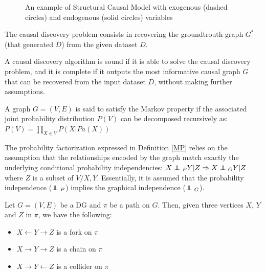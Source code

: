 \begin{figure}[!h]
\centering
{}
\caption{An example of Structural Causal Model with exogenous (dashed circles) and endogenous (solid circles) variables}
\label{scm}
\end{figure}


\begin{definition}
    The causal discovery problem consists in recovering the groundtrouth graph $G^*$ (that generated $D$) from the given dataset $D$.
\end{definition}
\begin{definition}
    A causal discovery algorithm is sound if it is able to solve the causal discovery problem, and it is complete if it outputs the most informative causal graph $G$ that can be recovered from the input dataset $D$, without making further assumptions.
\end{definition}
\begin{definition}\label{MP}
    A graph $G =(V, E)$ is said to satisfy the Markov property if the associated joint probability distribution $P(V)$ can be decomposed recursively as: $P(V) = \prod_{X \in V} P(X|Pa(X))$
\end{definition}
The probability factorization expressed in Definition \ref{MP} relies on the assumption that the relationships encoded by the graph match exactly the underlying conditional probability independencies:
$X \independent_P Y | Z \Rightarrow X \independent_G Y | Z$ where $Z$ is a subset of $V/{X, Y}$.
Essentially, it is assumed that the probability independence ($\independent_P$) implies the graphical independence ($\independent_G$).
\begin{definition}\label{fcc}
     Let $G =(V, E)$ be a DG and $\pi$ be a path on $G$. Then, given three vertices $X$, $Y$ and $Z$ in $\pi$, we have the following:
     \begin{itemize}
         \item $X\leftarrow Y \rightarrow Z$ is a fork on $\pi$
         \item $X \rightarrow Y \rightarrow Z$ is a chain on $\pi$
         \item $X \rightarrow Y \leftarrow Z$ is a collider on $\pi$
     \end{itemize}
\end{definition}

